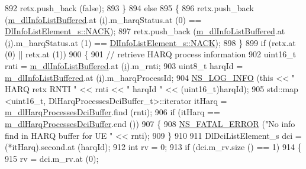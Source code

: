 \begin{DoxyCode}
892           retx.push\_back (\textcolor{keyword}{false});
893         \}
894       \textcolor{keywordflow}{else}
895         \{
896           retx.push\_back (\hyperlink{classns3_1_1TdTbfqFfMacScheduler_aabf2460c78d16c5202cdcda020ba06dd}{m\_dlInfoListBuffered}.at (\hyperlink{bernuolliDistribution_8m_a6f6ccfcf58b31cb6412107d9d5281426}{i}).m\_harqStatus.at (0) == 
      \hyperlink{structns3_1_1DlInfoListElement__s_a3e55b89f756b7bd8909c8116a202a17aaf90e76e67c86729b4ee21927b7fb1770}{DlInfoListElement\_s::NACK});
897           retx.push\_back (\hyperlink{classns3_1_1TdTbfqFfMacScheduler_aabf2460c78d16c5202cdcda020ba06dd}{m\_dlInfoListBuffered}.at (\hyperlink{bernuolliDistribution_8m_a6f6ccfcf58b31cb6412107d9d5281426}{i}).m\_harqStatus.at (1) == 
      \hyperlink{structns3_1_1DlInfoListElement__s_a3e55b89f756b7bd8909c8116a202a17aaf90e76e67c86729b4ee21927b7fb1770}{DlInfoListElement\_s::NACK});
898         \}
899       \textcolor{keywordflow}{if} (retx.at (0) || retx.at (1))
900         \{
901           \textcolor{comment}{// retrieve HARQ process information}
902           uint16\_t rnti = \hyperlink{classns3_1_1TdTbfqFfMacScheduler_aabf2460c78d16c5202cdcda020ba06dd}{m\_dlInfoListBuffered}.at (\hyperlink{bernuolliDistribution_8m_a6f6ccfcf58b31cb6412107d9d5281426}{i}).m\_rnti;
903           uint8\_t harqId = \hyperlink{classns3_1_1TdTbfqFfMacScheduler_aabf2460c78d16c5202cdcda020ba06dd}{m\_dlInfoListBuffered}.at (\hyperlink{bernuolliDistribution_8m_a6f6ccfcf58b31cb6412107d9d5281426}{i}).m\_harqProcessId;
904           \hyperlink{group__logging_gafbd73ee2cf9f26b319f49086d8e860fb}{NS\_LOG\_INFO} (\textcolor{keyword}{this} << \textcolor{stringliteral}{" HARQ retx RNTI "} << rnti << \textcolor{stringliteral}{" harqId "} << (uint16\_t)harqId);
905           std::map <uint16\_t, DlHarqProcessesDciBuffer\_t>::iterator itHarq = 
      \hyperlink{classns3_1_1TdTbfqFfMacScheduler_a50d8986111a3dc24130127d3ea391d7e}{m\_dlHarqProcessesDciBuffer}.find (rnti);
906           \textcolor{keywordflow}{if} (itHarq == \hyperlink{classns3_1_1TdTbfqFfMacScheduler_a50d8986111a3dc24130127d3ea391d7e}{m\_dlHarqProcessesDciBuffer}.end ())
907             \{
908               \hyperlink{group__fatal_ga5131d5e3f75d7d4cbfd706ac456fdc85}{NS\_FATAL\_ERROR} (\textcolor{stringliteral}{"No info find in HARQ buffer for UE "} << rnti);
909             \}
910 
911           DlDciListElement\_s dci = (*itHarq).second.at (harqId);
912           \textcolor{keywordtype}{int} rv = 0;
913           \textcolor{keywordflow}{if} (dci.m\_rv.size () == 1)
914             \{
915               rv = dci.m\_rv.at (0);

\end{DoxyCode}
